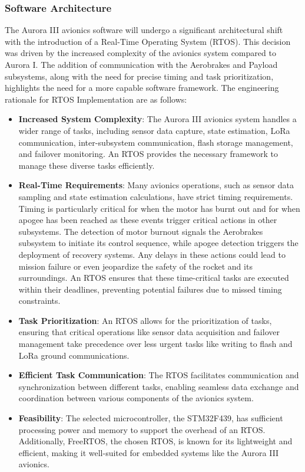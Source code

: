 \subsubsection{Software Architecture}
The Aurora III avionics software will undergo a significant architectural shift with the introduction of a Real-Time Operating System (RTOS). This decision was driven by the increased complexity of the avionics system compared to Aurora I. The addition of communication with the Aerobrakes and Payload subsystems, along with the need for precise timing and task prioritization, highlights the need for a more capable software framework. The engineering rationale for RTOS Implementation are as follows:  

\begin{itemize}
  \item \textbf{Increased System Complexity}: The Aurora III avionics system handles a wider range of tasks, including sensor data capture, state estimation, LoRa communication, inter-subsystem communication, flash storage management, and failover monitoring. An RTOS provides the necessary framework to manage these diverse tasks efficiently. 
  \item \textbf{Real-Time Requirements}: Many avionics operations, such as sensor data sampling and state estimation calculations, have strict timing requirements. Timing is particularly critical for when the motor has burnt out and for when apogee has been reached as these events trigger critical actions in other subsystems. The detection of motor burnout signals the Aerobrakes subsystem to initiate its control sequence, while apogee detection triggers the deployment of recovery systems. Any delays in these actions could lead to mission failure or even jeopardize the safety of the rocket and its surroundings. An RTOS ensures that these time-critical tasks are executed within their deadlines, preventing potential failures due to missed timing constraints. 
  \item \textbf{Task Prioritization}: An RTOS allows for the prioritization of tasks, ensuring that critical operations like sensor data acquisition and failover management take precedence over less urgent tasks like writing to flash and LoRa ground communications. 
  \item \textbf{Efficient Task Communication}: The RTOS facilitates communication and synchronization between different tasks, enabling seamless data exchange and coordination between various components of the avionics system. 
  \item \textbf{Feasibility}: The selected microcontroller, the STM32F439, has sufficient processing power and memory to support the overhead of an RTOS. Additionally, FreeRTOS, the chosen RTOS, is known for its lightweight and efficient, making it well-suited for embedded systems like the Aurora III avionics. 
\end{itemize}


